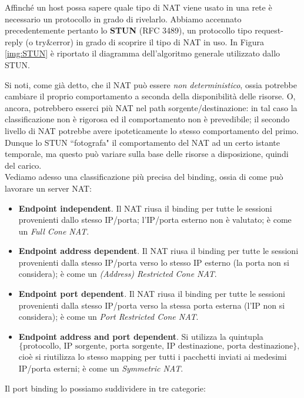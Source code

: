 Affinché un host possa sapere quale tipo di NAT viene usato in una rete è necessario un protocollo in grado di rivelarlo. Abbiamo accennato precedentemente pertanto lo \textbf{STUN} (RFC 3489), un protocollo tipo request-reply (o try\&error) in grado di scoprire il tipo di NAT in uso. In Figura \ref{img:STUN} è riportato il diagramma dell'algoritmo generale utilizzato dallo STUN.

Si noti, come già detto, che il NAT può essere \textit{non deterministico}, ossia potrebbe cambiare il proprio comportamento a seconda della disponibilità delle risorse. O, ancora, potrebbero esserci più NAT nel path sorgente/destinazione: in tal caso la classificazione non è rigorosa ed il comportamento non è prevedibile; il secondo livello di NAT potrebbe avere ipoteticamente lo stesso comportamento del primo. Dunque lo STUN \textquotedblleft fotografa" il comportamento del NAT ad un certo istante temporale, ma questo può variare sulla base delle risorse a disposizione, quindi del carico.\\
Vediamo adesso una classificazione più precisa del binding, ossia di come può lavorare un server NAT:
\begin{itemize}
	\item \textbf{Endpoint independent}. Il NAT riusa il binding per tutte le sessioni provenienti dallo stesso IP/porta; l'IP/porta esterno non è valutato; è come un \textit{Full Cone NAT}.
	
	\item \textbf{Endpoint address dependent}. Il NAT riusa il binding per tutte le sessioni provenienti dalla stesso IP/porta verso lo stesso IP esterno (la porta non si considera); è come un \textit{(Address) Restricted Cone NAT}.
	
	\item \textbf{Endpoint port dependent}. Il NAT riusa il binding per tutte le sessioni provenienti dalla stesso IP/porta verso la stessa porta esterna (l'IP non si considera); è come un \textit{Port Restricted Cone NAT}.
		
	\item \textbf{Endpoint address and port dependent}. Si utilizza la quintupla $$\{\text{protocollo, IP sorgente, porta sorgente, IP destinazione, porta destinazione}\},$$ cioè si riutilizza lo stesso mapping per tutti i pacchetti inviati ai medesimi IP/porta esterni; è come un \textit{Symmetric NAT}.
	
\end{itemize}
Il port binding lo possiamo suddividere in tre categorie:

